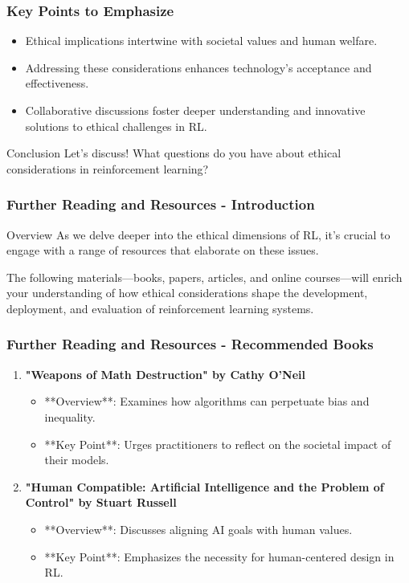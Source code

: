 \documentclass[aspectratio=169]{beamer}
\begin{document}
\begin{frame}[fragile]
    \frametitle{Key Points to Emphasize}
    \begin{itemize}
        \item Ethical implications intertwine with societal values and human welfare.
        \item Addressing these considerations enhances technology's acceptance and effectiveness.
        \item Collaborative discussions foster deeper understanding and innovative solutions to ethical challenges in RL.
    \end{itemize}
    \begin{block}{Conclusion}
        Let’s discuss! What questions do you have about ethical considerations in reinforcement learning?
    \end{block}
\end{frame}

\begin{frame}[fragile]
  \frametitle{Further Reading and Resources - Introduction}
  \begin{block}{Overview}
    As we delve deeper into the ethical dimensions of RL, it's crucial to engage with a range of resources that elaborate on these issues.
  \end{block}
  The following materials—books, papers, articles, and online courses—will enrich your understanding of how ethical considerations shape the development, deployment, and evaluation of reinforcement learning systems.
\end{frame}

\begin{frame}[fragile]
  \frametitle{Further Reading and Resources - Recommended Books}
  \begin{enumerate}
    \item \textbf{"Weapons of Math Destruction" by Cathy O'Neil}
      \begin{itemize}
        \item **Overview**: Examines how algorithms can perpetuate bias and inequality.
        \item **Key Point**: Urges practitioners to reflect on the societal impact of their models.
      \end{itemize}

    \item \textbf{"Human Compatible: Artificial Intelligence and the Problem of Control" by Stuart Russell}
      \begin{itemize}
        \item **Overview**: Discusses aligning AI goals with human values.
        \item **Key Point**: Emphasizes the necessity for human-centered design in RL.
      \end{itemize}
  \end{enumerate}
\end{frame}
\end{document}
